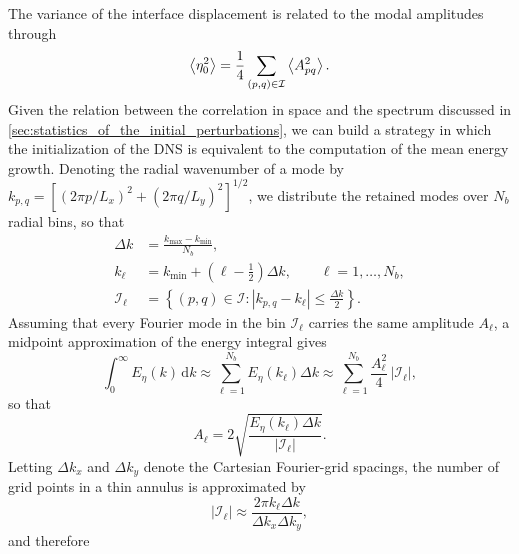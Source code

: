 The variance of the interface displacement is related to the modal amplitudes through
\begin{equation}
  \left\langle \eta_0^{2} \right\rangle
  =
  \frac{1}{4}
  \sum_{(p,q)\in\mathcal{I}}
  \left\langle A_{pq}^{2} \right\rangle.
  \label{eq:dns_variance_sum_rule}
\end{equation}
Given the relation between the correlation in space and the spectrum discussed in
\cref{sec:statistics_of_the_initial_perturbations}, we can build a strategy in which the
initialization of the DNS is equivalent to the computation of the mean energy growth. Denoting the
radial wavenumber of a mode by \(k_{p,q}=[(2\pi p/L_x)^2+(2\pi q/L_y)^2]^{1/2}\), we distribute
the retained modes over \(N_b\) radial bins, so that
\begin{subequations}
\label{eq:dns_radial_bins}
\begin{align}
  \Delta k
  &= \frac{k_{\max}-k_{\min}}{N_b},
  \label{eq:dns_radial_bin_width}
  \\
  k_\ell
  &= k_{\min}+\left(\ell-\frac{1}{2}\right)\Delta k,
  \qquad \ell=1,\ldots,N_b,
  \label{eq:dns_radial_bin_centers}
  \\
  \mathcal{I}_\ell
  &=
  \left\{
    (p,q)\in\mathcal{I}:
    \left|k_{p,q}-k_\ell\right|\leq\frac{\Delta k}{2}
  \right\}.
  \label{eq:dns_radial_bin_index_set}
\end{align}
\end{subequations}
Assuming that every Fourier mode in the bin \(\mathcal{I}_\ell\) carries the same amplitude
\(A_\ell\), a midpoint approximation of the energy integral gives
\begin{equation}
  \int_0^\infty E_{\eta}(k)\,\mathrm{d}k
  \approx
  \sum_{\ell=1}^{N_b} E_{\eta}(k_\ell)\Delta k
  \approx
  \sum_{\ell=1}^{N_b}\frac{A_\ell^2}{4}\,\left|\mathcal{I}_\ell\right| ,
  \label{eq:dns_midpoint_energy_integral}
\end{equation}
so that
\begin{equation}
  A_\ell
  =
  2\sqrt{\frac{E_{\eta}(k_\ell)\Delta k}{\left|\mathcal{I}_\ell\right|}} .
  \label{eq:dns_continuous_shell_amplitude}
\end{equation}
Letting \(\Delta k_x\) and \(\Delta k_y\) denote the Cartesian Fourier-grid spacings, the
number of grid points in a thin annulus is approximated by
\begin{equation}
  \left|\mathcal{I}_\ell\right|
  \approx
  \frac{2\pi k_\ell\Delta k}{\Delta k_x\Delta k_y},
  \label{eq:dns_shell_mode_count}
\end{equation}
and therefore
